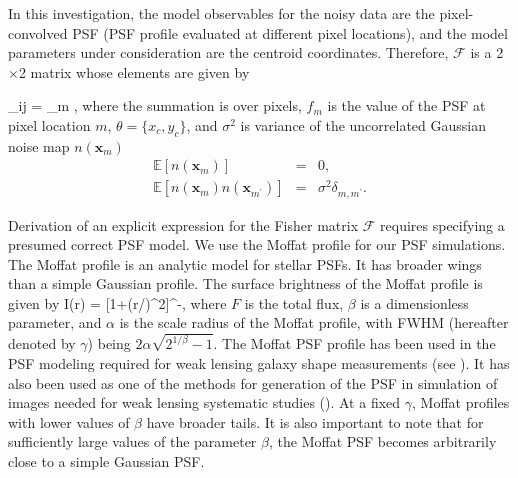 
  
In this investigation, the model observables for the noisy data are the pixel-convolved PSF (PSF profile evaluated at different pixel locations), and  
the model parameters under consideration are the centroid coordinates. Therefore, $\mathcal{F}$
is a 2$\times$2 matrix whose elements are given by

\beq
  _{ij} = \sum_{m}
                ,
\label{fish}
\eeq
where the summation is over pixels, $f_{m}$ is the value of the PSF at pixel location $m$,
$\theta=\{x_{c},y_{c}\}$, and $\sigma^{2}$ is variance of the uncorrelated Gaussian noise map $n(\mathbf{x}_{m})$
\begin{eqnarray}
\mathbb{E}[n(\mathbf{x}_{m})] &=& 0, \\
\mathbb{E}[n(\mathbf{x}_{m})n(\mathbf{x}_{m^{\prime}})] &=& \sigma^{2}\delta_{m,m^{\prime}}. 
\end{eqnarray}

Derivation of an explicit expression for the Fisher matrix $\mathcal{F}$ requires 
specifying a presumed correct PSF model.
We use the Moffat profile \citep{moffat} for our PSF simulations. 
The Moffat profile is an analytic model for stellar PSFs. It has broader wings than
a simple Gaussian profile. The surface brightness of the Moffat profile is given by
\beq
I(r) = [1+(r/\alpha)^{2}]^{-\beta},
\label{mof}
\eeq
where $F$ is the total flux, $\beta$ is a dimensionless parameter, and $\alpha$ is
the scale radius of the Moffat profile, with FWHM (hereafter denoted by $\gamma$)
being $2\alpha\sqrt{2^{1/\beta}-1}$. The Moffat PSF profile has been used in the PSF modeling required for weak lensing galaxy shape measurements (see \citealt{im3shape,im3shape_code}). It has also been used as one of the methods for generation of the PSF in simulation of images needed for weak lensing systematic studies (\citealt{galsim}).
At a fixed $\gamma$, Moffat profiles with lower values
of $\beta$ have broader tails. It is also important to note that for sufficiently large values of the 
parameter $\beta$, the Moffat PSF becomes arbitrarily close to a simple Gaussian PSF. 

